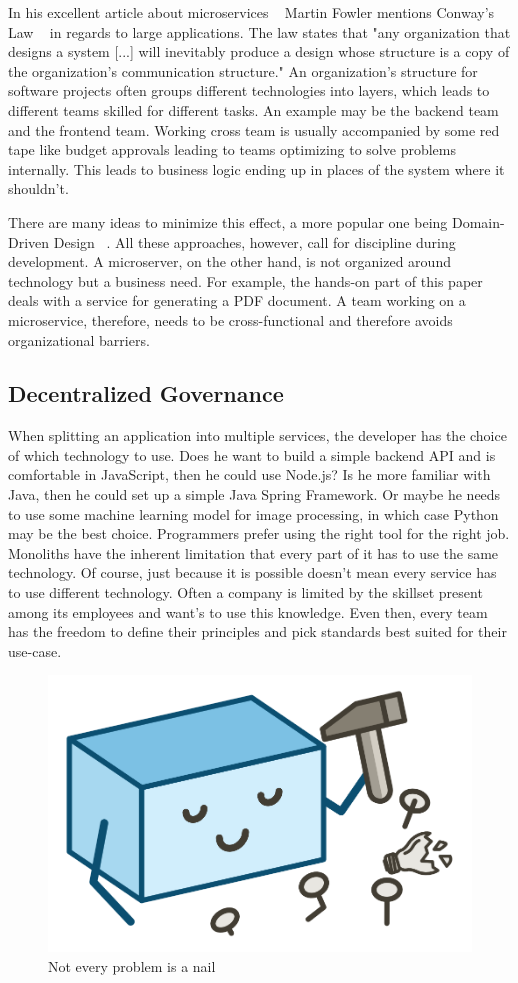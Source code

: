 In his excellent article about microservices ~\cite{microservices.2014} Martin Fowler mentions Conway's Law ~\cite{conway.1968} in regards to large applications. The law states that "any organization that designs a system [...] will inevitably produce a design whose structure is a copy of the organization's communication structure." An organization's structure for software projects often groups different technologies into layers, which leads to different teams skilled for different tasks. An example may be the backend team and the frontend team. Working cross team is usually accompanied by some red tape like budget approvals leading to teams optimizing to solve problems internally. This leads to business logic ending up in places of the system where it shouldn't.

There are many ideas to minimize this effect, a more popular one being Domain-Driven Design ~\cite{evans.2003}. All these approaches, however, call for discipline during development. A microserver, on the other hand, is not organized around technology but a business need. For example, the hands-on part of this paper deals with a service for generating a PDF document. A team working on a microservice, therefore, needs to be cross-functional and therefore avoids organizational barriers.


\subsection{Decentralized Governance}

When splitting an application into multiple services, the developer has the choice of which technology to use. Does he want to build a simple backend API and is comfortable in JavaScript, then he could use Node.js? Is he more familiar with Java, then he could set up a simple Java Spring Framework. Or maybe he needs to use some machine learning model for image processing, in which case Python may be the best choice. Programmers prefer using the right tool for the right job. Monoliths have the inherent limitation that every part of it has to use the same technology. Of course, just because it is possible doesn't mean every service has to use different technology. Often a company is limited by the skillset present among its employees and want's to use this knowledge. Even then, every team has the freedom to define their principles and pick standards best suited for their use-case.

\begin{figure}[ht]
  \centering
  \includegraphics[width=0.4\linewidth]{assets/illustration-monolith-hammer.png}
  \caption{Not every problem is a nail}
  \label{fig:illustration-monolith-hammer}
\end{figure}

